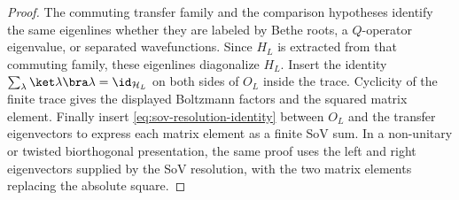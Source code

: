 \begin{proof}
The commuting transfer family and the comparison hypotheses identify the same
eigenlines whether they are labeled by Bethe roots, a \(Q\)-operator
eigenvalue, or separated wavefunctions.  Since \(H_L\) is extracted from that
commuting family, these eigenlines diagonalize \(H_L\).  Insert the identity
\(\sum_\lambda\ket\lambda\bra\lambda=\id_{\mathcal H_L}\) on both sides of
\(O_L\) inside the trace.  Cyclicity of the finite trace gives the displayed
Boltzmann factors and the squared matrix element.  Finally insert
\eqref{eq:sov-resolution-identity} between \(O_L\) and the transfer
eigenvectors to express each matrix element as a finite SoV sum.  In a
non-unitary or twisted biorthogonal presentation, the same proof uses the
left and right eigenvectors supplied by the SoV resolution, with the two
matrix elements replacing the absolute square.
\end{proof}

